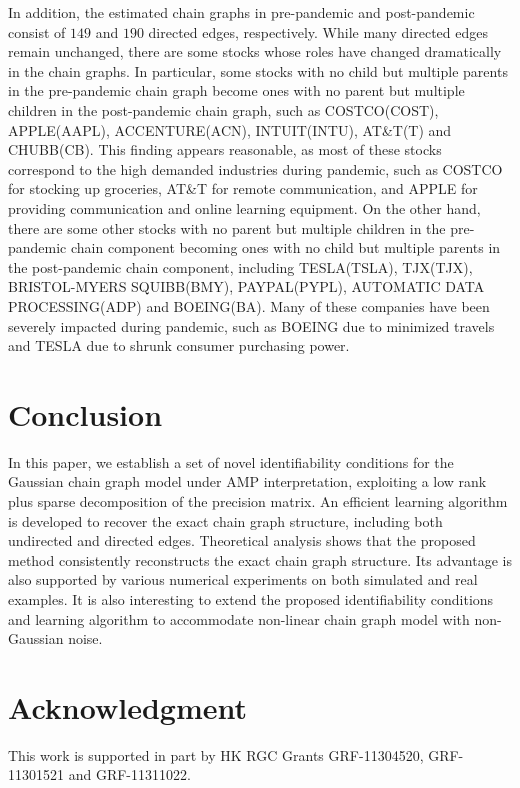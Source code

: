 \documentclass[12pt]{article}
\newcommand{\1}{\uppercase\expandafter{\romannumeral1}}
\newcommand{\2}{\uppercase\expandafter{\romannumeral2}}
\newcommand{\0}{\textbf{0}}
\begin{document}
In addition, the estimated chain graphs in pre-pandemic and post-pandemic consist of $149$ and $190$ directed edges, respectively. While many directed edges remain unchanged, there are some stocks whose roles have changed dramatically in the chain graphs. In particular, some stocks with no child but multiple parents in the pre-pandemic chain graph become ones with no parent but multiple children in the post-pandemic chain graph, such as COSTCO(COST), APPLE(AAPL), ACCENTURE(ACN), INTUIT(INTU), AT\&T(T) and CHUBB(CB). This finding appears reasonable, as most of these stocks correspond to the high demanded industries during pandemic, such as COSTCO for stocking up groceries, AT\&T for remote communication, and APPLE for providing communication and online learning equipment. On the other hand, there are some other stocks with no parent but multiple children in the pre-pandemic chain component  becoming
ones with no child but multiple parents in the post-pandemic chain component, including TESLA(TSLA), TJX(TJX), BRISTOL-MYERS SQUIBB(BMY), PAYPAL(PYPL), AUTOMATIC DATA PROCESSING(ADP) and BOEING(BA). Many of these companies have been severely impacted during pandemic, such as BOEING due to minimized travels and TESLA due to shrunk consumer purchasing power.

\section{Conclusion}\label{sec:conclusion}

In this paper, we establish a set of novel identifiability conditions for the Gaussian chain graph model under AMP interpretation, exploiting a low rank plus sparse decomposition of the precision matrix.
An efficient learning algorithm is developed to recover the exact chain graph structure, including both undirected and directed edges. Theoretical analysis shows that the proposed method consistently reconstructs
the exact chain graph structure. Its advantage is also supported by various numerical experiments on both simulated and real examples. It is also interesting to extend the proposed identifiability conditions and learning algorithm to accommodate non-linear chain graph model with non-Gaussian noise.

\section*{Acknowledgment}

This work is supported in part by HK RGC Grants GRF-11304520, GRF-11301521 and GRF-11311022.







 

\end{document}
